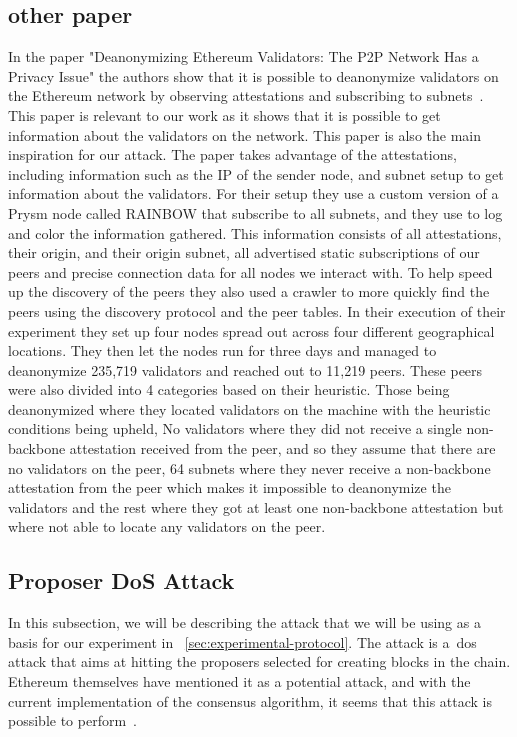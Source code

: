 \subsection{other paper}\label{subsec:other-papers} 
In the paper "Deanonymizing Ethereum Validators: The P2P Network Has a Privacy Issue" the authors show that it is possible to deanonymize validators on the Ethereum network by observing attestations and subscribing to subnets~\cite{heimbach2024deanonymizingethereumvalidatorsp2p}.
This paper is relevant to our work as it shows that it is possible to get information about the validators on the network.
This paper is also the main inspiration for our attack.
The paper takes advantage of the attestations, including information such as the IP of the sender node, and subnet setup to get information about the validators.
For their setup they use a custom version of a Prysm node called RAINBOW that subscribe to all subnets, and they use to log and color the information gathered.
This information consists of all attestations, their origin, and their origin subnet, all advertised static subscriptions of our peers and precise connection data for all nodes we interact with.
To help speed up the discovery of the peers they also used a crawler to more quickly find the peers using the discovery protocol and the peer tables.
In their execution of their experiment they set up four nodes spread out across four different geographical locations.
They then let the nodes run for three days and managed to deanonymize 235,719 validators and reached out to 11,219 peers.
These peers were also divided into 4 categories based on their heuristic.
Those being deanonymized where they located validators on the machine with the heuristic conditions being upheld, No validators where they did not receive a single non-backbone attestation received from the peer, and so they assume that there are no validators on the peer, 64 subnets where they never receive a non-backbone attestation from the peer which makes it impossible to deanonymize the validators and the rest where they got at least one non-backbone attestation but where not able to locate any validators on the peer.




\subsection{Proposer DoS Attack}\label{subsec:proposer-dos-attack}
In this subsection, we will be describing the attack that we will be using as a basis for our experiment in ~\autoref{sec:experimental-protocol}.
The attack is a~\gls{dos} attack that aims at hitting the proposers selected for creating blocks in the chain.
Ethereum themselves have mentioned it as a potential attack, and with the current implementation of the consensus algorithm, it seems that this attack is possible to perform~\cite{EthereumSSLE2024,EthereumAttackDefense2024}.

